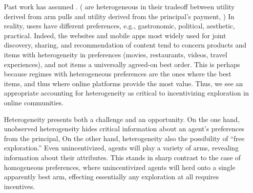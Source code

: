 Past work has assumed .
(\citet{han2015incentivizing}  are
heterogeneous in their tradeoff between utility derived from arm pulls
and utility derived from the principal's payment,
)
In reality, users have different preferences, e.g., gastronomic,
political, aesthetic, practical.
Indeed, the websites and mobile apps most widely used for joint discovery,
sharing, and recommendation of content tend to concern products and items 
with heterogeneity in preferences (movies, restaurants,
videos, travel experiences), and not items  a universally
agreed-on best order.
This is perhaps because regimes with heterogeneous preferences are the
ones where  the best items, 
and thus where online
platforms provide the most value.  
Thus, we see an appropriate
accounting for heterogeneity as critical to incentivizing
exploration in online communities.

Heterogeneity presents both a challenge and an opportunity.
On the one hand, unobserved heterogeneity hides critical
information about an agent's preferences from the principal,
On the other hand, heterogeneity also 
the possibility of ``free exploration.''
Even  unincentivized, agents will
play a variety of arms, revealing information about their attributes.
This stands in sharp contrast to the case of homogeneous preferences,
where unincentivized agents will herd onto a single apparently best arm,
 effecting essentially any exploration at all requires incentives.

